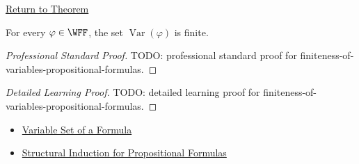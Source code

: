 \newpage
{}
\label{prf:finiteness-of-variables-propositional-formulas}

\begin{remark*}[Return]
\hyperref[lem:finiteness-of-variables-propositional-formulas]{Return to Theorem}
\end{remark*}

\begin{theorem*}
For every \(\varphi\in\WFF\), the set \(\operatorname{Var}(\varphi)\) is finite.
\end{theorem*}

\begin{proof}[Professional Standard Proof]
\LRAProofBodyStart
TODO: professional standard proof for finiteness-of-variables-propositional-formulas.
\end{proof}

\begin{proof}[Detailed Learning Proof]
\LRAProofBodyStart
TODO: detailed learning proof for finiteness-of-variables-propositional-formulas.
\end{proof}

\begin{remark*}
\end{remark*}

\begin{dependencies}
\begin{itemize}
  \item \hyperref[def:formula-variable-set-propositional-logic]{Variable Set of a Formula}
  \item \hyperref[thm:structural-induction-propositional-formulas]{Structural Induction for Propositional Formulas}
\end{itemize}
\end{dependencies}

\clearpage
